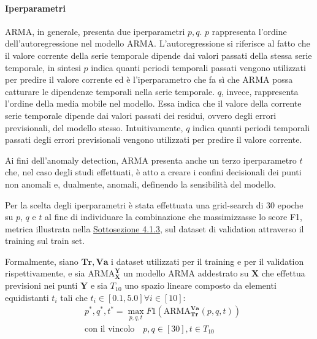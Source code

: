     \paragraph{Iperparametri} ARMA, in generale, presenta due iperparametri $p,q$. $p$ rappresenta l'ordine 
    dell'autoregressione nel modello ARMA. L'autoregressione si riferisce al fatto che il valore corrente 
    della serie temporale dipende dai valori passati della stessa serie temporale, in sintesi $p$ indica 
    quanti periodi temporali passati vengono utilizzati per predire il valore corrente ed è l'iperparametro 
    che fa sì che ARMA possa catturare le dipendenze temporali nella serie temporale. $q$, invece, 
    rappresenta l'ordine della media mobile nel modello. Essa indica che il valore della corrente serie 
    temporale dipende dai valori passati dei residui, ovvero degli errori previsionali, del modello stesso.
    Intuitivamente, $q$ indica quanti periodi temporali passati degli errori previsionali vengono utilizzati per 
    predire il valore corrente.

    Ai fini dell'anomaly detection, ARMA presenta anche un terzo iperparametro $t$ che, nel caso degli studi effettuati,
    è atto a creare i confini decisionali dei punti non anomali e, dualmente, anomali, definendo la sensibilità 
    del modello. 

    Per la scelta degli iperparametri è stata effettuata una grid-search di 30 epoche su $p$, $q$ e $t$  al fine di 
    individuare la combinazione che massimizzasse lo score F1, metrica illustrata nella \hyperref[f1-score]{Sottosezione 4.1.3}, 
    sul dataset di validation attraverso il training sul train set.

    Formalmente, siano $\mathbf{Tr}, \mathbf{Va}$ i dataset utilizzati per il training e
    per il validation rispettivamente, e sia $\text{ARMA}_\mathbf{X}^\mathbf{Y}$ un modello ARMA addestrato su 
    $\mathbf{X}$ che effettua previsioni nei punti $\mathbf{Y}$ e sia $T_{10}$ uno spazio lineare composto da 
    elementi equidistanti $t_i$ tali che $t_i \in [0.1, 5.0] \forall i \in [10]$:
    \begin{equation}
    \label{eq:arma-problem}
    \begin{aligned}
        & p^*, q^*, t^* = \max_{p, q, t} F1(\text{ARMA}_\mathbf{Tr}^\mathbf{Va}(p, q, t)) \\
        & \text{con il vincolo} \quad p, q \in [30], t \in T_{10}
    \end{aligned}
    \end{equation}


